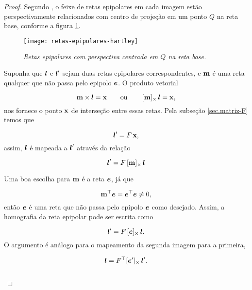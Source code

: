\begin{proof}
Segundo \cite{Hartley2004}, o feixe de retas epipolares em cada imagem estão perspectivamente relacionados com centro de projeção em um ponto $Q$ na reta base, conforme a figura \ref{fig.retas-epi-hartley}.

\begin{figure}[!htb]
\centering
\texttt{[image: retas-epipolares-hartley]}
\caption{\textit{Retas epipolares com perspectiva centrada em $Q$ na reta base.}}
\label{fig.retas-epi-hartley}
\end{figure}


Suponha que $\boldsymbol{l}$ e $\boldsymbol{l}'$ sejam duas retas epipolares correspondentes, e ${\bf m}$ é uma reta qualquer que não passa pelo epipolo $\boldsymbol{e}$. O produto vetorial 

\begin{equation}
{\bf m}\times\boldsymbol{l}=\mathbf{x}\qquad\text{ou}\qquad\,[{\bf m}]_\times\,\boldsymbol{l}=\mathbf{x},
\end{equation}
nos fornece o ponto $\mathbf{x}$ de interseção entre essas retas. Pela subseção \ref{sec.matriz-F} temos que

\begin{equation*}
\boldsymbol{l}'=F\,\mathbf{x},
\end{equation*} 
assim, $\boldsymbol{l}$ é mapeada a $\boldsymbol{l}'$ através da relação 

\begin{equation*}
\boldsymbol{l}'=F\,[{\bf m}]_\times\,\boldsymbol{l}
\end{equation*}


Uma boa escolha para ${\bf m}$ é a reta $\boldsymbol{e}$, já que

\begin{equation*}
{\bf m}^\top\boldsymbol{e}=\boldsymbol{e}^\top\boldsymbol{e}\neq0,
\end{equation*}
então $\boldsymbol{e}$ é uma reta que não passa pelo epipolo $\boldsymbol{e}$ como desejado. Assim, a homografia da reta epipolar pode ser escrita como 

\begin{equation*}
\boldsymbol{l}'=F\,[\boldsymbol{e}]_\times\,\boldsymbol{l}.
\end{equation*}
O argumento é análogo para o mapeamento da segunda imagem para a primeira,

\begin{equation*}
\boldsymbol{l}=F^\top [\boldsymbol{e}']_\times\,\boldsymbol{l}'.
\end{equation*}\\


\end{proof}


